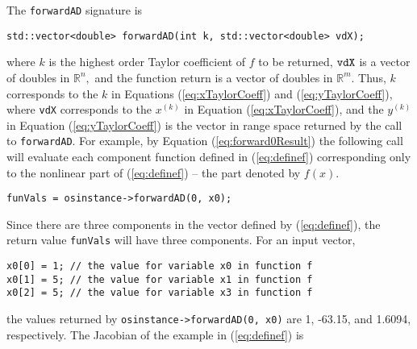 \documentclass[11pt]{article}
\renewcommand{\_}{{\char"5F}}
\renewcommand{\{}{{\char"7B}}
\renewcommand{\}}{{\char"7D}}
\renewcommand{\^}{{\char"0D}}
\renewcommand{\'}{{\char"0D}}
\begin{document}
The {\tt forwardAD} signature is
\begin{verbatim}
std::vector<double> forwardAD(int k, std::vector<double> vdX);
\end{verbatim}
where $k$ is the highest order Taylor coefficient of $f$ to be returned,  $\tt vdX$ is a vector of doubles in $ \mathbb{R}^{n},$ and the function return is a vector of doubles in $ \mathbb{R}^{m}.$  Thus, $k$ corresponds to the $k$ in Equations  (\ref{eq:xTaylorCoeff}) and (\ref{eq:yTaylorCoeff}),  where {\tt vdX} corresponds to the $x^{(k)}$ in Equation (\ref{eq:xTaylorCoeff}), and the $y^{(k)}$ in Equation (\ref{eq:yTaylorCoeff}) is the vector in range space returned by the call to {\tt  forwardAD}.    For example, by  Equation (\ref{eq:forward0Result}) the following call will evaluate each component function defined in (\ref{eq:definef}) corresponding only to the nonlinear part of (\ref{eq:definef}) -- the part denoted by $f(x)$.
\begin{verbatim}
funVals = osinstance->forwardAD(0, x0);
\end{verbatim}
Since there are three components in the vector defined by  (\ref{eq:definef}), the return value  {\tt funVals} will have three components. For an input vector,
\begin{verbatim}
x0[0] = 1; // the value for variable x0 in function f
x0[1] = 5; // the value for variable x1 in function f
x0[2] = 5; // the value for variable x3 in function f
\end{verbatim}
the values returned by {\tt osinstance->forwardAD(0, x0)}  are 1, -63.15, and 1.6094, respectively.
The Jacobian of the example in (\ref{eq:definef}) is
\end{document}
